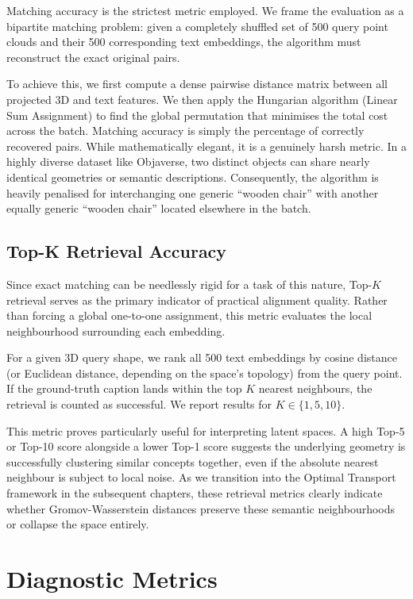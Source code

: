 Matching accuracy is the strictest metric employed. We frame the evaluation as a bipartite matching problem: given a completely shuffled set of 500 query point clouds and their 500 corresponding text embeddings, the algorithm must reconstruct the exact original pairs.

To achieve this, we first compute a dense pairwise distance matrix between all projected 3D and text features. We then apply the Hungarian algorithm (Linear Sum Assignment) to find the global permutation that minimises the total cost across the batch. Matching accuracy is simply the percentage of correctly recovered pairs. While mathematically elegant, it is a genuinely harsh metric. In a highly diverse dataset like Objaverse, two distinct objects can share nearly identical geometries or semantic descriptions. Consequently, the algorithm is heavily penalised for interchanging one generic ``wooden chair'' with another equally generic ``wooden chair'' located elsewhere in the batch.

\subsection{Top-K Retrieval Accuracy}
\label{subsec:topk_acc}

Since exact matching can be needlessly rigid for a task of this nature, Top-$K$ retrieval serves as the primary indicator of practical alignment quality. Rather than forcing a global one-to-one assignment, this metric evaluates the local neighbourhood surrounding each embedding.

For a given 3D query shape, we rank all 500 text embeddings by cosine distance (or Euclidean distance, depending on the space's topology) from the query point. If the ground-truth caption lands within the top $K$ nearest neighbours, the retrieval is counted as successful. We report results for $K \in \{1, 5, 10\}$.

This metric proves particularly useful for interpreting latent spaces. A high Top-5 or Top-10 score alongside a lower Top-1 score suggests the underlying geometry is successfully clustering similar concepts together, even if the absolute nearest neighbour is subject to local noise. As we transition into the Optimal Transport framework in the subsequent chapters, these retrieval metrics clearly indicate whether Gromov-Wasserstein distances preserve these semantic neighbourhoods or collapse the space entirely.

\section{Diagnostic Metrics}
\label{sec:diagnostic_metrics}

